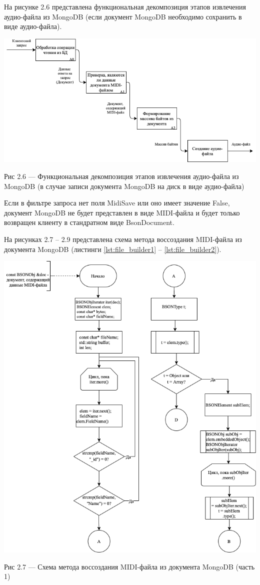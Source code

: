На рисунке 2.6 представлена функциональная декомпозиция этапов извлечения аудио-файла из MongoDB (если документ MongoDB необходимо сохранить в виде аудио-файла).

\begin{center}
		\includegraphics[scale=0.55]{tex/img/DecomposeFind.png}
		
			Рис 2.6 — Функциональная декомпозиция этапов извлечения аудио-файла из MongoDB (в случае записи документа MongoDB на диск в виде аудио-файла)
\end{center} 

Если в фильтре запроса нет поля MidiSave или оно имеет значение False, документ MongoDB не будет представлен в виде MIDI-файла и будет только возвращен клиенту в стандратном виде BsonDocument.

На рисунках 2.7 -- 2.9  представлена схема метода воссоздания MIDI-файла из документа MongoDB (листинги \ref{lst:file_builder1} -- \ref{lst:file_builder2}).

\begin{center}
		\includegraphics[scale=0.65]{tex/img/FileBuilder1.png}
		
			Рис 2.7 — Схема метода воссоздания MIDI-файла из документа MongoDB (часть 1)
\end{center}

